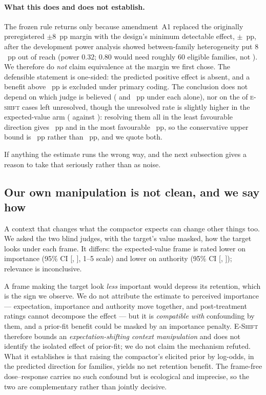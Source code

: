 \paragraph{What this does and does not establish.} The frozen rule returns
\textbf{\EShiftDecision{}} only because amendment~A1 replaced the originally preregistered $\pm8$~pp
margin with the design's minimum detectable effect, $\pm$\SESOI{}~pp, after the development power
analysis showed between-family heterogeneity put $8$~pp out of reach (power $0.32$; $0.80$ would need
roughly $60$ eligible families, not \EShiftNFam{}). We therefore do \emph{not} claim equivalence at
the margin we first chose. The defensible statement is one-sided: the predicted positive effect is
absent, and a benefit above \ConeUpper{}~pp is excluded under primary coding. The conclusion does not
depend on which judge is believed (\ConeJudgeOne{} and \ConeJudgeTwo{}~pp under each alone), nor on
the \EShiftUnresRate{} of \textsc{e-shift} cases left unresolved, though the unresolved rate is
slightly higher in the expected-value arm (\EShiftUnresPlus{} against \EShiftUnresMinus{}): resolving
them all in the least favourable direction gives \ConeWorstAgainst{}~pp and in the most favourable
\ConeWorstFor{}~pp, so the conservative upper bound is \ConeUpperWorst{}~pp rather than \ConeUpper{}~pp, and we
quote both.

If anything the estimate runs the wrong way, and the next subsection gives a reason to take that
seriously rather than as noise.

\subsection{Our own manipulation is not clean, and we say how}
\label{sec:parity}
A context that changes what the compactor expects can change other things too. We asked the two blind
judges, with the target's value masked, how the target looks under each frame. It differs: the
expected-value frame is rated \ParityImp{} lower on importance (95\% CI [\ParityImpLo{},
\ParityImpHi{}], 1--5 scale) and \ParityAuth{} lower on authority (95\% CI [\ParityAuthLo{},
\ParityAuthHi{}]); relevance is inconclusive.

A frame making the target look \emph{less} important would depress its retention, which is the sign we
observe. We do not attribute the estimate to perceived importance --- expectation, importance and
authority move together, and post-treatment ratings cannot decompose the effect --- but it is
\emph{compatible with} confounding by them, and a prior-fit benefit could be masked by an importance
penalty. \textsc{E-Shift} therefore bounds an \emph{expectation-shifting context manipulation} and
does not identify the isolated effect of prior-fit; we do not claim the mechanism refuted. What it
establishes is that raising the compactor's elicited prior by \ShiftMeanConf{} log-odds, in the
predicted direction for \ShiftDirectionCountConf{} families, yields no net retention benefit. The
frame-free dose--response carries no such confound but is ecological and imprecise, so the two are
complementary rather than jointly decisive.

